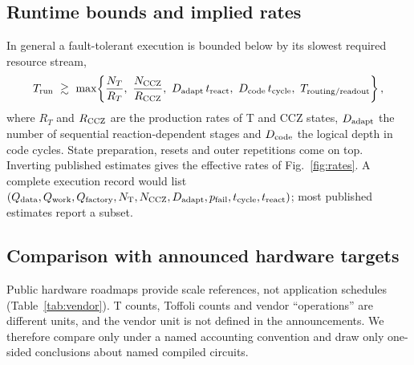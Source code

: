 \subsection{Runtime bounds and implied rates}
In general a fault-tolerant execution is bounded below by its slowest required resource stream,
\begin{equation}
T_{\rm run}\ \gtrsim\ \max\!\left\{\frac{N_T}{R_T},\ \frac{N_{\rm CCZ}}{R_{\rm CCZ}},\ D_{\rm adapt}\,t_{\rm react},\ D_{\rm code}\,t_{\rm cycle},\ T_{\rm routing/readout}\right\},
\label{eq:bottleneck}
\end{equation}
where $R_T$ and $R_{\rm CCZ}$ are the production rates of T and CCZ states, $D_{\rm adapt}$ the number of sequential reaction-dependent stages and $D_{\rm code}$ the logical depth in code cycles. State preparation, resets and outer repetitions come on top. Inverting published estimates gives the effective rates of Fig.~\ref{fig:rates}. A complete execution record would list
$(Q_{\rm data}, Q_{\rm work}, Q_{\rm factory}, N_{\rm T}, N_{\rm CCZ}, D_{\rm adapt}, p_{\rm fail}, t_{\rm cycle}, t_{\rm react})$; most published estimates report a subset.



\subsection{Comparison with announced hardware targets}
\label{app:vendor}
Public hardware roadmaps provide scale references, not application schedules (Table~\ref{tab:vendor}). T counts, Toffoli counts and vendor ``operations'' are different units, and the vendor unit is not defined in the announcements. We therefore compare only under a named accounting convention and draw only one-sided conclusions about named compiled circuits.

